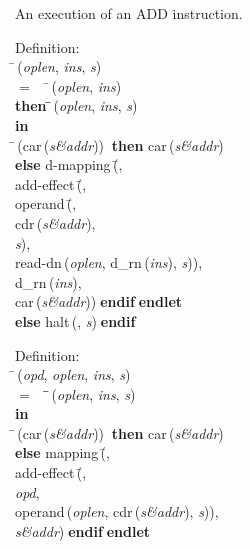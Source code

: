 An execution of an ADD instruction.
\begin{tabbing}{\sc Definition}: \\  
\=\,({\it{oplen\/}}, {\it{ins\/}}, {\it{s\/}}) \\ 
$=$$\;\;\;\;$\=\,({\it{oplen\/}}, {\it{ins\/}}) \\ 
{\bf then }\=\=\,({\it{oplen\/}}, {\it{ins\/}}, {\it{s\/}})\- \\ 
{\bf in} \\ 
\=\,({\rm{car}}\,({\it{s\&addr\/}}))$\;\;${\bf then }{\rm{car}}\,({\it{s\&addr\/}}) \\ 
{\bf else }{\rm{d-mapping}}\,(\=, \\ 
{\rm{add-effect}}\,(\=, \\ 
{\rm{operand}}\,(\=, \\ 
{\rm{cdr}}\,({\it{s\&addr\/}}), \\ 
{\it{s\/}})\-, \\ 
{\rm{read-dn}}\,({\it{oplen\/}}, {\rm{d\_rn}}\,({\it{ins\/}}), {\it{s\/}}))\-, \\ 
{\rm{d\_rn}}\,({\it{ins\/}}), \\ 
{\rm{car}}\,({\it{s\&addr\/}}))\-$\;${\bf  endif}\-$\;${\bf  endlet}\- \\ 
{\bf else }{\rm{halt}}\,({}, {\it{s\/}})$\;${\bf  endif}\-\-
\end{tabbing}

\begin{tabbing}{\sc Definition}: \\  
\=\,({\it{opd\/}}, {\it{oplen\/}}, {\it{ins\/}}, {\it{s\/}}) \\ 
$=$$\;\;\;\;$\=\=\,({\it{oplen\/}}, {\it{ins\/}}, {\it{s\/}})\- \\ 
{\bf in} \\ 
\=\,({\rm{car}}\,({\it{s\&addr\/}}))$\;\;${\bf then }{\rm{car}}\,({\it{s\&addr\/}}) \\ 
{\bf else }{\rm{mapping}}\,(\=, \\ 
{\rm{add-effect}}\,(\=, \\ 
{\it{opd\/}}, \\ 
{\rm{operand}}\,({\it{oplen\/}}, {\rm{cdr}}\,({\it{s\&addr\/}}), {\it{s\/}}))\-, \\ 
{\it{s\&addr\/}})\-$\;${\bf  endif}\-$\;${\bf  endlet}\-\-
\end{tabbing}
                  
